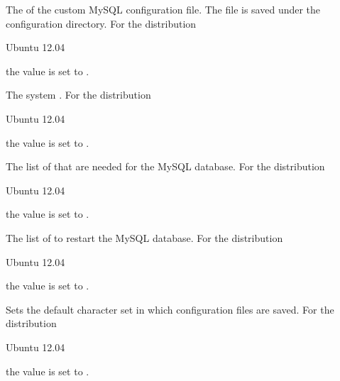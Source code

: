 
The  of the custom MySQL configuration file. The file is saved
under the configuration directory.
For the distribution
\begin{inparaitem}
\item[\TheDistribution{ubuntu}] Ubuntu 12.04
\end{inparaitem}
the value is set to .


The system . 
For the distribution
\begin{inparaitem}
\item[\TheDistribution{ubuntu}] Ubuntu 12.04
\end{inparaitem}
the value is set to .


The list of  that are needed for the MySQL database. 
For the distribution
\begin{inparaitem}
\item[\TheDistribution{ubuntu}] Ubuntu 12.04
\end{inparaitem}
the value is set to .


The list of  to restart the MySQL database.
For the distribution
\begin{inparaitem}
\item[\TheDistribution{ubuntu}] Ubuntu 12.04
\end{inparaitem}
the value is set to .


Sets the default character set  in which configuration files are 
saved. For the distribution
\begin{inparaitem}
\item[\TheDistribution{ubuntu}] Ubuntu 12.04
\end{inparaitem}
the value is set to .


